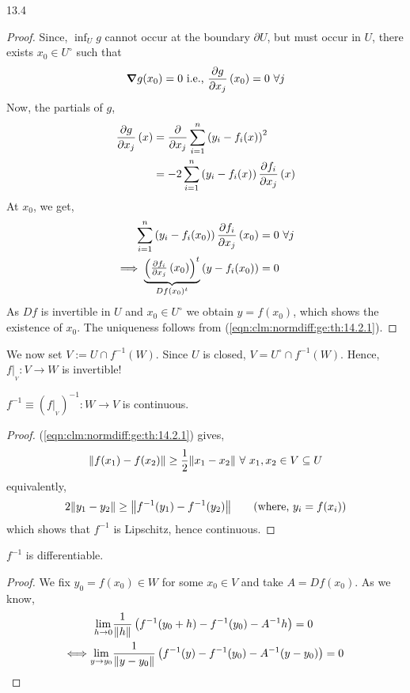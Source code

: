 \documentclass[../Analysis-3.tex]{subfiles}
\begin{document}
\begin{proofFig}{}{}{\label{fig:inf:fun}}{13}{.4\textwidth}
\begin{proof}
    Since, $ \inf_U g $ cannot occur at the boundary $ \partial U $, but must occur in $ U $, there exists $ x_0 \in U^{\circ} $ such that
    \[\grad g(x_0) = 0 \text{ i.e., } \pdv{g}{x_j}\left( x_0 \right) = 0 \ \forall j \]
    Now, the partials of $ g $,
    \begin{align*}
      \pdv{g}{x_j}\left( x \right)
       & = \pdv{x_j} \sum_{i=1}^{n}\left( y_i - f_i(x) \right)^2                     \\
       & = -2\sum_{i=1}^{n}\left( y_i - f_i(x) \right)\pdv{f_i}{x_j}\left( x \right)
    \end{align*}
    At $ x_0 $, we get,
    \begin{align*}
      \sum_{i=1}^{n}\left( y_i - f_i(x_0) \right)\pdv{f_i}{x_j}\left( x_0 \right) & = 0 \ \forall j          \\
      \implies \underbrace{\begin{pmatrix}
                               \pdv{f_i}{x_j}\left( x_0 \right)
                             \end{pmatrix}^t}_{Df(x_0)^t} \left( y-f_i(x_0) \right)                      & = 0
    \end{align*}
    As $ Df $ is invertible in $ U $ and $ x_0 \in U^{\circ} $ we obtain $ y = f(x_0) $, which shows the existence of $ x_0 $. The uniqueness follows from (\ref{eqn:clm:normdiff:ge:th:14.2.1}).
  \end{proof}

  We now set $ V := U \cap f^{-1}(W) $. Since $ U $ is closed, $ V = U^{\circ} \cap f^{-1}(W) $. Hence, $ f\vert_{{}_V}: V \to W $ is invertible!


  \begin{clmBox}
    $ f^{-1} \equiv \left( f\vert_{{}_V} \right)^{-1}:W \to V $ is continuous.
  \end{clmBox}

  \begin{proof}
    (\ref{eqn:clm:normdiff:ge:th:14.2.1}) gives,
    \[  \norm{f(x_1) - f(x_2)} \geq \frac{1}{2}\norm{x_1 - x_2} \ \forall\ x_1,x_2 \in V \subseteq U  \]
    equivalently,
    \[  2\norm{y_1 - y_2} \geq \norm{f^{-1}(y_1) - f^{-1}(y_2)}   \tag{where, $ y_i = f(x_i) $}  \]
    which shows that $ f^{-1} $ is Lipschitz, hence continuous.
  \end{proof}


  \begin{clmBox}
    $ f^{-1} $ is differentiable.
  \end{clmBox}

  \begin{proof}
    We fix $ y_0 = f(x_0) \in W $ for some $ x_0 \in V $ and take $ A = Df(x_0) $. As we know,
    \begin{align}
      \lim_{h \to 0}                       & \frac{1}{\norm{h}}\left( f^{-1}(y_0+h) - f^{-1}(y_0) - A^{-1}h \right)              = 0  \nonumber                  \\
      \Longleftrightarrow \lim_{y \to y_0} & \frac{1}{\norm{y-y_0}}\left( f^{-1}(y) - f^{-1}(y_0) - A^{-1}(y-y_0) \right) = 0 \label{eqn:clm:lim:finv:th:14.2.1}
    \end{align}


\end{proof}
\end{proofFig}
\end{document}
